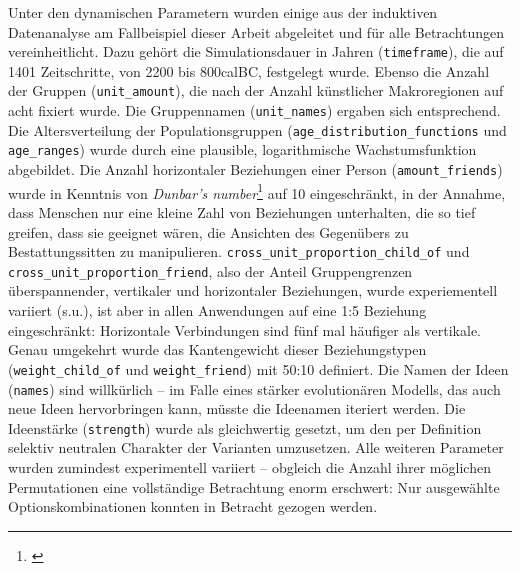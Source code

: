 \documentclass[openany,twoside,twocolumn]{book}
\let\rmarkdownfootnote\footnote%
\def\footnote{\protect\rmarkdownfootnote}
\begin{document}
Unter den dynamischen Parametern wurden einige aus der induktiven Datenanalyse am Fallbeispiel dieser Arbeit abgeleitet und für alle Betrachtungen vereinheitlicht. Dazu gehört die Simulationsdauer in Jahren (\texttt{timeframe}), die auf 1401 Zeitschritte, von 2200 bis 800calBC, festgelegt wurde. Ebenso die Anzahl der Gruppen (\texttt{unit\_amount}), die nach der Anzahl künstlicher Makroregionen auf acht fixiert wurde. Die Gruppennamen (\texttt{unit\_names}) ergaben sich entsprechend. Die Altersverteilung der Populationsgruppen (\texttt{age\_distribution\_functions} und \texttt{age\_ranges}) wurde durch eine plausible, logarithmische Wachstumsfunktion abgebildet. Die Anzahl horizontaler Beziehungen einer Person (\texttt{amount\_friends}) wurde in Kenntnis von \emph{Dunbar's number}\footnote{\textcite{dunbar_neocortex_1992}} auf 10 eingeschränkt, in der Annahme, dass Menschen nur eine kleine Zahl von Beziehungen unterhalten, die so tief greifen, dass sie geeignet wären, die Ansichten des Gegenübers zu Bestattungssitten zu manipulieren. \texttt{cross\_unit\_proportion\_child\_of} und \texttt{cross\_unit\_proportion\_friend}, also der Anteil Gruppengrenzen überspannender, vertikaler und horizontaler Beziehungen, wurde experiementell variiert (s.u.), ist aber in allen Anwendungen auf eine 1:5 Beziehung eingeschränkt: Horizontale Verbindungen sind fünf mal häufiger als vertikale. Genau umgekehrt wurde das Kantengewicht dieser Beziehungstypen (\texttt{weight\_child\_of} und \texttt{weight\_friend}) mit 50:10 definiert. Die Namen der Ideen (\texttt{names}) sind willkürlich -- im Falle eines stärker evolutionären Modells, das auch neue Ideen hervorbringen kann, müsste die Ideenamen iteriert werden. Die Ideenstärke (\texttt{strength}) wurde als gleichwertig gesetzt, um den per Definition selektiv neutralen Charakter der Varianten umzusetzen. Alle weiteren Parameter wurden zumindest experimentell variiert -- obgleich die Anzahl ihrer möglichen Permutationen eine vollständige Betrachtung enorm erschwert: Nur ausgewählte Optionskombinationen konnten in Betracht gezogen werden.
\end{document}
